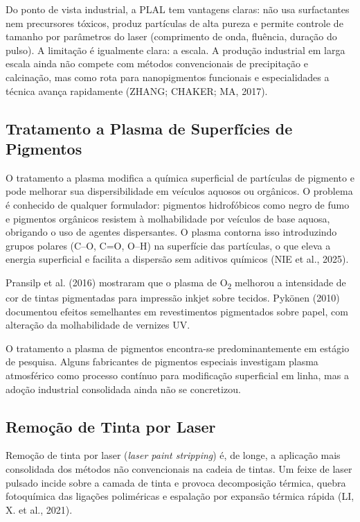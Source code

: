 \documentclass[
  12pt,
  a4paper,
  oneside,
  brazil,
  chapter=TITLE
]{article}
\begin{document}
Do ponto de vista industrial, a PLAL tem vantagens claras: não usa surfactantes nem precursores tóxicos, produz partículas de alta pureza e permite controle de tamanho por parâmetros do laser (comprimento de onda, fluência, duração do pulso). A limitação é igualmente clara: a escala. A produção industrial em larga escala ainda não compete com métodos convencionais de precipitação e calcinação, mas como rota para nanopigmentos funcionais e especialidades a técnica avança rapidamente (ZHANG; CHAKER; MA, 2017).

\subsection{Tratamento a Plasma de Superfícies de Pigmentos}\label{plasma-pigmentos}

O tratamento a plasma modifica a química superficial de partículas de pigmento e pode melhorar sua dispersibilidade em veículos aquosos ou orgânicos. O problema é conhecido de qualquer formulador: pigmentos hidrofóbicos como negro de fumo e pigmentos orgânicos resistem à molhabilidade por veículos de base aquosa, obrigando o uso de agentes dispersantes. O plasma contorna isso introduzindo grupos polares (C--O, C=O, O--H) na superfície das partículas, o que eleva a energia superficial e facilita a dispersão sem aditivos químicos (NIE et al., 2025).

Pransilp et al. (2016) mostraram que o plasma de O\textsubscript{2} melhorou a intensidade de cor de tintas pigmentadas para impressão inkjet sobre tecidos. Pykönen (2010) documentou efeitos semelhantes em revestimentos pigmentados sobre papel, com alteração da molhabilidade de vernizes UV.

O tratamento a plasma de pigmentos encontra-se predominantemente em estágio de pesquisa. Alguns fabricantes de pigmentos especiais investigam plasma atmosférico como processo contínuo para modificação superficial em linha, mas a adoção industrial consolidada ainda não se concretizou.

\subsection{Remoção de Tinta por Laser}\label{remocao-laser}

Remoção de tinta por laser (\textit{laser paint stripping}) é, de longe, a aplicação mais consolidada dos métodos não convencionais na cadeia de tintas. Um feixe de laser pulsado incide sobre a camada de tinta e provoca decomposição térmica, quebra fotoquímica das ligações poliméricas e espalação por expansão térmica rápida (LI, X. et al., 2021).
\end{document}
